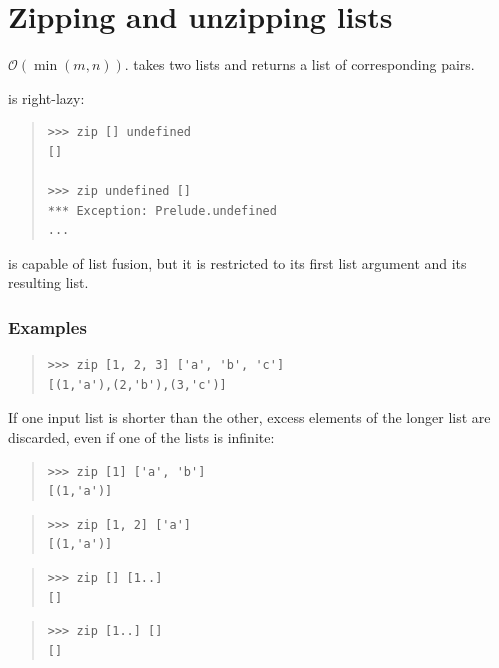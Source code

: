 \section{Zipping and unzipping lists}
\begin{haddockdesc}
\item[\begin{tabular}{@{}l}
zip :: {\char 91}a{\char 93} -> {\char 91}b{\char 93} -> {\char 91}(a, b){\char 93}
\end{tabular}]
{\haddockbegindoc
\(\mathcal{O}(\min(m,n))\).  takes two lists and returns a list of
 corresponding pairs.\par
{} is right-lazy:\par
\begin{quote}
{\haddockverb\begin{verbatim}
>>> zip [] undefined
[]

>>> zip undefined []
*** Exception: Prelude.undefined
...

\end{verbatim}}
\end{quote}
 is capable of list fusion, but it is restricted to its
 first list argument and its resulting list.\par
\subsubsection*{\textbf{Examples}}
\begin{quote}
{\haddockverb\begin{verbatim}
>>> zip [1, 2, 3] ['a', 'b', 'c']
[(1,'a'),(2,'b'),(3,'c')]

\end{verbatim}}
\end{quote}
If one input list is shorter than the other, excess elements of the longer
 list are discarded, even if one of the lists is infinite:\par
\begin{quote}
{\haddockverb\begin{verbatim}
>>> zip [1] ['a', 'b']
[(1,'a')]

\end{verbatim}}
\end{quote}
\begin{quote}
{\haddockverb\begin{verbatim}
>>> zip [1, 2] ['a']
[(1,'a')]

\end{verbatim}}
\end{quote}
\begin{quote}
{\haddockverb\begin{verbatim}
>>> zip [] [1..]
[]

\end{verbatim}}
\end{quote}
\begin{quote}
{\haddockverb\begin{verbatim}
>>> zip [1..] []
[]

\end{verbatim}}
\end{quote}}
\end{haddockdesc}

